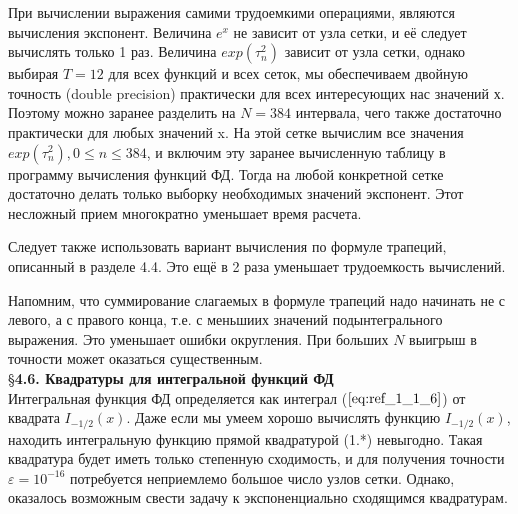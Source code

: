 При вычислении выражения самими трудоемкими операциями, являются вычисления экспонент. Величина $e^x$ не зависит от узла сетки, и её следует вычислять только 1 раз. Величина $exp(\tau_n^2)$ зависит от узла сетки, однако выбирая $T = 12$ для всех функций и всех сеток, мы обеспечиваем двойную точность (double precision) практически для всех интересующих нас значений х. Поэтому можно заранее разделить на $N = 384$ интервала, чего также достаточно практически для любых значений x. На этой сетке вычислим все значения $exp(\tau_n^2), 0 \leqslant n \leqslant 384$, и включим эту заранее вычисленную таблицу в программу вычисления функций ФД. Тогда на любой конкретной сетке достаточно делать только выборку необходимых значений экспонент. Этот несложный прием многократно уменьшает время расчета.

Следует также использовать вариант вычисления по формуле трапеций, описанный в разделе 4.4. Это ещё в 2 раза уменьшает трудоемкость вычислений.

Напомним, что суммирование слагаемых в формуле трапеций надо начинать не с левого, а с правого конца, т.е. с меньшиих значений подынтегрального выражения. Это уменьшает ошибки округления. При больших $N$ выигрыш в точности может оказаться существенным.
\\

\S \textbf{4.6. Квадратуры для интегральной функций ФД}
\\

Интегральная функция ФД определяется как интеграл ($\ref{eq:ref_1_1_6}$) от квадрата $I_{-1/2}(x)$. Даже если мы умеем хорошо вычислять функцию $I_{-1/2}(x)$, находить интегральную функцию прямой квадратурой (1.*) невыгодно. Такая квадратура будет иметь только степенную сходимость, и для получения точности $\varepsilon = 10^{-16}$ потребуется неприемлемо большое число узлов сетки. Однако, оказалось возможным свести задачу к экспоненциально сходящимся квадратурам.

